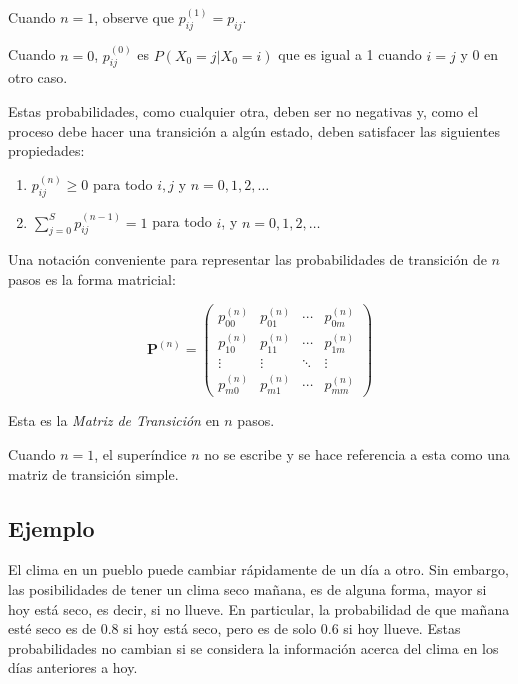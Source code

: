 \documentclass{article}
\begin{document}
Cuando \( n=1 \), observe que \( p_{ij}^{(1)} = p_{ij} \).

Cuando \( n=0 \), \( p_{ij}^{(0)} \) es \( P(X_0 = j | X_0 = i) \) que es igual a 1 cuando \( i=j \) y 0 en otro caso.

\newpage

Estas probabilidades, como cualquier otra, deben ser no negativas y, como el proceso debe hacer una transición a algún estado, deben satisfacer las siguientes propiedades:

\begin{enumerate}
    \item \( p_{ij}^{(n)} \geq 0 \) para todo \( i, j \) y \( n=0,1,2,\ldots \)
    \item \( \sum_{j=0}^{S} p_{ij}^{(n-1)} = 1 \) para todo \( i \), y \( n=0,1,2,\ldots \)
\end{enumerate}

\vspace{.25cm}

Una notación conveniente para representar las probabilidades de transición de \( n \) pasos es la forma matricial:

\[
    \mathbf{P}^{(n)} =
    \begin{pmatrix}
        p_{00}^{(n)} & p_{01}^{(n)} & \cdots & p_{0m}^{(n)} \\
        p_{10}^{(n)} & p_{11}^{(n)} & \cdots & p_{1m}^{(n)} \\
        \vdots       & \vdots       & \ddots & \vdots       \\
        p_{m0}^{(n)} & p_{m1}^{(n)} & \cdots & p_{mm}^{(n)}
    \end{pmatrix}
\]

Esta es la \textit{Matriz de Transición} en \( n \) pasos.

Cuando \( n=1 \), el superíndice \( n \) no se escribe y se hace referencia a esta como una matriz de transición simple.

\subsection{Ejemplo}

El clima en un pueblo puede cambiar rápidamente de un día a otro. Sin embargo, las posibilidades de tener un clima seco mañana, es de alguna forma, mayor si hoy está seco, es decir, si no llueve. En particular, la probabilidad de que mañana esté seco es de 0.8 si hoy está seco, pero es de solo 0.6 si hoy llueve. Estas probabilidades no cambian si se considera la información acerca del clima en los días anteriores a hoy.
\end{document}
